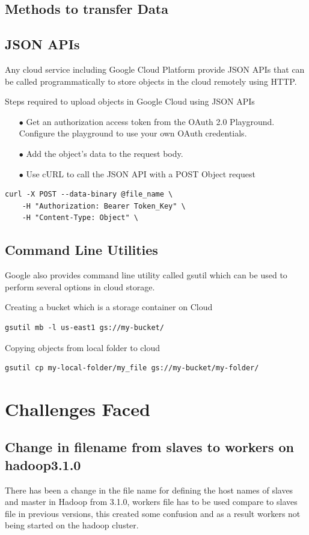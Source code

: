 \subsection{Methods to transfer Data}

\subsection{JSON APIs}
Any cloud service including Google Cloud Platform provide JSON APIs that can be called programmatically to store objects in the cloud remotely using HTTP.

Steps required to upload objects in Google Cloud using JSON APIs
\begin{itemize}
\item[$\bullet$] Get an authorization access token from the OAuth 2.0 Playground. Configure the playground to use your own OAuth credentials.
\item[$\bullet$] Add the object's data to the request body.
\item[$\bullet$] Use cURL to call the JSON API with a POST Object request
\end{itemize} 
\begin{verbatim}
curl -X POST --data-binary @file_name \
    -H "Authorization: Bearer Token_Key" \
    -H "Content-Type: Object" \
\end{verbatim}
\subsection{Command Line Utilities}
Google also provides command line utility called gsutil which can be used to perform several options in cloud storage.

Creating a bucket which is a storage container on Cloud
\begin{verbatim}
gsutil mb -l us-east1 gs://my-bucket/
\end{verbatim}

Copying objects from local folder to cloud
\begin{verbatim}
gsutil cp my-local-folder/my_file gs://my-bucket/my-folder/
\end{verbatim}

\section{Challenges Faced}
\subsection{Change in filename from slaves to workers on hadoop3.1.0}
There has been a change in the file name for defining the host names of slaves and master in Hadoop from 3.1.0, workers file has to be used compare to slaves file in previous versions, this created some confusion and as a result workers not being started on the hadoop cluster.
